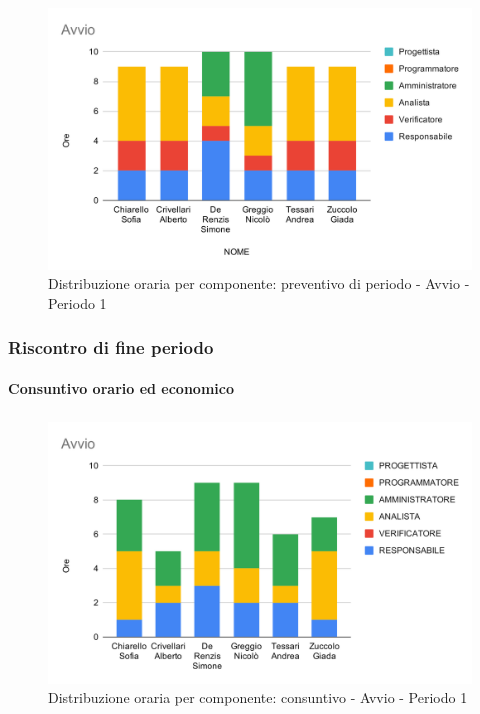 \begin{figure}[H]
	\centering
	\includegraphics[scale=2]{res/images/charts/preventivo/avvio.png}
	\caption{Distribuzione oraria per componente: preventivo di periodo - Avvio - Periodo 1}
\end{figure}

\subsubsection{Riscontro di fine periodo}

\paragraph{Consuntivo orario ed economico}
\subparagraph*{}

\contabilitaTable{
	
}

\begin{figure}[H]
	\centering
	\includegraphics[scale=2]{res/images/charts/consuntivo/avvio.png}
	\caption{Distribuzione oraria per componente: consuntivo - Avvio - Periodo 1}
\end{figure}

